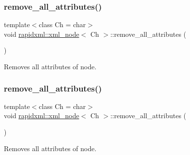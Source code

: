 \subsubsection{\texorpdfstring{remove\+\_\+all\+\_\+attributes()}{remove\_all\_attributes()}\hspace{0.1cm}{\footnotesize\ttfamily [1/2]}}
{\footnotesize\ttfamily template$<$class Ch = char$>$ \\
void \mbox{\hyperlink{classrapidxml_1_1xml__node}{rapidxml\+::xml\+\_\+node}}$<$ Ch $>$\+::remove\+\_\+all\+\_\+attributes (\begin{DoxyParamCaption}{ }\end{DoxyParamCaption})\hspace{0.3cm}{\ttfamily [inline]}}



Removes all attributes of node. 

\mbox{\label{classrapidxml_1_1xml__node_aa8d5d9484aa1eb5ff1841a073c84c1aa}} 
\subsubsection{\texorpdfstring{remove\+\_\+all\+\_\+attributes()}{remove\_all\_attributes()}\hspace{0.1cm}{\footnotesize\ttfamily [2/2]}}
{\footnotesize\ttfamily template$<$class Ch = char$>$ \\
void \mbox{\hyperlink{classrapidxml_1_1xml__node}{rapidxml\+::xml\+\_\+node}}$<$ Ch $>$\+::remove\+\_\+all\+\_\+attributes (\begin{DoxyParamCaption}{ }\end{DoxyParamCaption})\hspace{0.3cm}{\ttfamily [inline]}}



Removes all attributes of node. 

\mbox{\label{classrapidxml_1_1xml__node_a95735358b079ae0adcfbbac69aa1fbc3}} 

